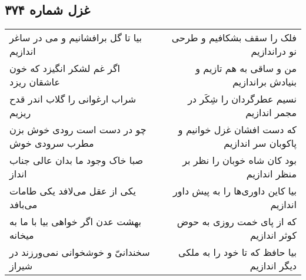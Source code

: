 \begin{center}
\section*{غزل شماره ۳۷۴}
\label{sec:sh374}
\begin{longtable}{l p{0.5cm} r}
بیا تا گل برافشانیم و می در ساغر اندازیم
&&
فلک را سقف بشکافیم و طرحی نو دراندازیم
\\
اگر غم لشکر انگیزد که خون عاشقان ریزد
&&
من و ساقی به هم تازیم و بنیادش براندازیم
\\
شراب ارغوانی را گلاب اندر قدح ریزیم
&&
نسیم عطرگردان را شِکَر در مجمر اندازیم
\\
چو در دست است رودی خوش بزن مطرب سرودی خوش
&&
که دست افشان غزل خوانیم و پاکوبان سر اندازیم
\\
صبا خاک وجود ما بدان عالی جناب انداز
&&
بود کان شاه خوبان را نظر بر منظر اندازیم
\\
یکی از عقل می‌لافد یکی طامات می‌بافد
&&
بیا کاین داوری‌ها را به پیش داور اندازیم
\\
بهشت عدن اگر خواهی بیا با ما به میخانه
&&
که از پای خمت روزی به حوض کوثر اندازیم
\\
سخندانیّ و خوشخوانی نمی‌ورزند در شیراز
&&
بیا حافظ که تا خود را به ملکی دیگر اندازیم
\\
\end{longtable}
\end{center}
